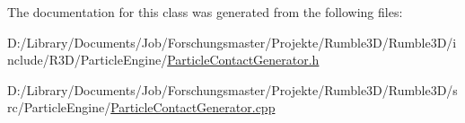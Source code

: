 The documentation for this class was generated from the following files\+:\begin{DoxyCompactItemize}
\item 
D\+:/\+Library/\+Documents/\+Job/\+Forschungsmaster/\+Projekte/\+Rumble3\+D/\+Rumble3\+D/include/\+R3\+D/\+Particle\+Engine/\mbox{\hyperlink{_particle_contact_generator_8h}{Particle\+Contact\+Generator.\+h}}\item 
D\+:/\+Library/\+Documents/\+Job/\+Forschungsmaster/\+Projekte/\+Rumble3\+D/\+Rumble3\+D/src/\+Particle\+Engine/\mbox{\hyperlink{_particle_contact_generator_8cpp}{Particle\+Contact\+Generator.\+cpp}}\end{DoxyCompactItemize}
